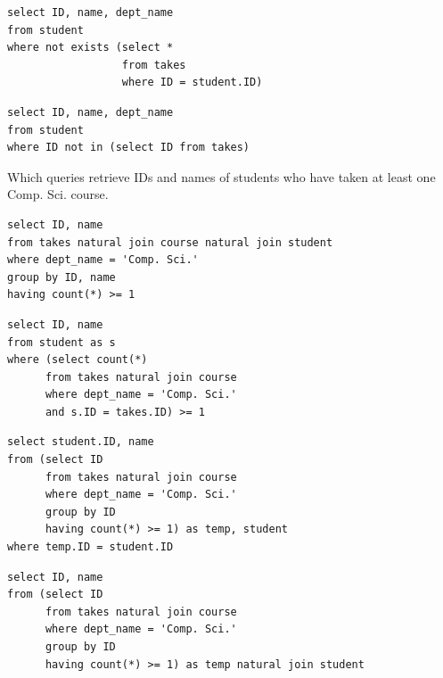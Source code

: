 \documentclass[12pt]{exam}
\begin{document}
\begin{questions}
\begin{minipage}{\linewidth}
\begin{checkboxes}
\CorrectChoice
\begin{verbatim}
select ID, name, dept_name
from student
where not exists (select * 
                  from takes 
                  where ID = student.ID)
\end{verbatim}

\CorrectChoice
\begin{verbatim}
select ID, name, dept_name
from student
where ID not in (select ID from takes)
\end{verbatim}

\end{checkboxes}
\end{minipage}\vspace{1em}

\begin{minipage}{\linewidth}
\question[8]
Which queries retrieve IDs and names of students who have taken at least one Comp. Sci. course.\par\vspace{0.5em}

\begin{checkboxes}
\choice
\begin{verbatim}
select ID, name
from takes natural join course natural join student
where dept_name = 'Comp. Sci.'
group by ID, name
having count(*) >= 1
\end{verbatim}

\CorrectChoice
\begin{verbatim}
select ID, name
from student as s
where (select count(*)
      from takes natural join course
      where dept_name = 'Comp. Sci.'
      and s.ID = takes.ID) >= 1
\end{verbatim}

\CorrectChoice
\begin{verbatim}
select student.ID, name
from (select ID
      from takes natural join course
      where dept_name = 'Comp. Sci.'
      group by ID
      having count(*) >= 1) as temp, student
where temp.ID = student.ID
\end{verbatim}

\CorrectChoice
\begin{verbatim}
select ID, name
from (select ID
      from takes natural join course
      where dept_name = 'Comp. Sci.'
      group by ID
      having count(*) >= 1) as temp natural join student
\end{verbatim}

\end{checkboxes}
\end{minipage}\vspace{1em}


\end{questions}
\end{document}
